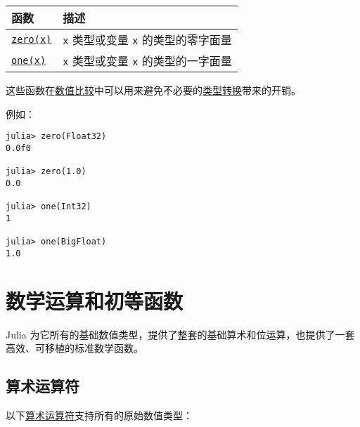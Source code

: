 \begin{table}[h]

\begin{tabulary}{\linewidth}{|L|L|}
\hline
函数 & 描述 \\
\hline
\hyperlink{240596739242881814}{\texttt{zero(x)}} & \texttt{x} 类型或变量 \texttt{x} 的类型的零字面量 \\
\hline
\hyperlink{11395333326208453101}{\texttt{one(x)}} & \texttt{x} 类型或变量 \texttt{x} 的类型的一字面量 \\
\hline
\end{tabulary}

\end{table}



这些函数在\hyperlink{7125151170457482788}{数值比较}中可以用来避免不必要的\hyperlink{10374023657104680331}{类型转换}带来的开销。



例如：




\begin{verbatim}
julia> zero(Float32)
0.0f0

julia> zero(1.0)
0.0

julia> one(Int32)
1

julia> one(BigFloat)
1.0
\end{verbatim}



\hypertarget{7792257531330504645}{}


\chapter{数学运算和初等函数}



Julia 为它所有的基础数值类型，提供了整套的基础算术和位运算，也提供了一套高效、可移植的标准数学函数。



\hypertarget{11578520796345832337}{}


\section{算术运算符}



以下\href{https://en.wikipedia.org/wiki/Arithmetic\#Arithmetic\_operations}{算术运算符}支持所有的原始数值类型：




